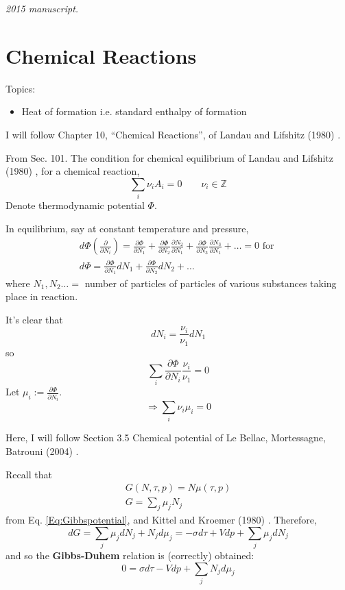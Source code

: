 \noindent\textit{2015 manuscript.}

\section{Chemical Reactions}
Topics:
\begin{itemize}
  \item Heat of formation i.e. standard enthalpy of formation
\end{itemize}

I will follow Chapter 10, ``Chemical Reactions'', of Landau and Lifshitz (1980) \cite{LLandauELifshitz1980}.  

From Sec. 101. The condition for chemical equilibrium of Landau and Lifshitz (1980) \cite{LLandauELifshitz1980}, for a chemical reaction,
\[
\sum_i \nu_i A_i = 0 \qquad \nu_i \in \mathbb{Z}
\]
Denote thermodynamic potential $\Phi$.  

In equilibrium, say at constant temperature and pressure, 
\[
\begin{gathered}
  d\Phi\left( \frac{ \partial }{ \partial N_i} \right) = \frac{ \partial \Phi}{ \partial N_1} + \frac{ \partial \Phi}{ \partial N_2} \frac{ \partial N_2}{ \partial N_1} + \frac{ \partial \Phi}{ \partial N_3} \frac{ \partial N_3}{ \partial N_1} + \dots = 0 \text{ for }  \\
  d\Phi = \frac{ \partial \Phi}{ \partial N_1} dN_1 + \frac{ \partial \Phi}{ \partial N_2} dN_2 + \dots 
\end{gathered}
\]
where $N_1, N_2 \dots =$ number of particles of particles of various substances taking place in reaction. 

It's clear that 
\[
dN_i = \frac{ \nu_i}{ \nu_1} dN_1
\]
so 
\[
\sum_i \frac{ \partial \Phi}{ \partial N_i} \frac{ \nu_i}{ \nu_1} = 0 
\]
Let $\mu_i := \frac{ \partial \Phi}{ \partial N_i}$.  
\begin{equation}
\Longrightarrow \sum_i \nu_i \mu_i = 0 
\end{equation}

Here, I will follow Section 3.5 Chemical potential of Le Bellac, Mortessagne, Batrouni (2004) \cite{MLeBellacFMortessagneGBatrouni2004}.  

Recall that 
\[
\begin{gathered}
  G(N,\tau,p) = N\mu(\tau,p) \\
  G = \sum_j \mu_j N_j 
\end{gathered}
\]
from Eq. \ref{Eq:Gibbspotential}, and Kittel and Kroemer (1980) \cite{CKittelHKroemer1980}.  Therefore,
\[
dG = \sum_j \mu_j dN_j + N_j d\mu_j = -\sigma d\tau + Vdp + \sum_j \mu_j dN_j
\]
and so the \textbf{Gibbs-Duhem} relation is (correctly) obtained:
\begin{equation}\label{Eq:Gibbs-Duhem}
  0 = \sigma d\tau - V dp + \sum_j N_j d\mu_j
\end{equation}

